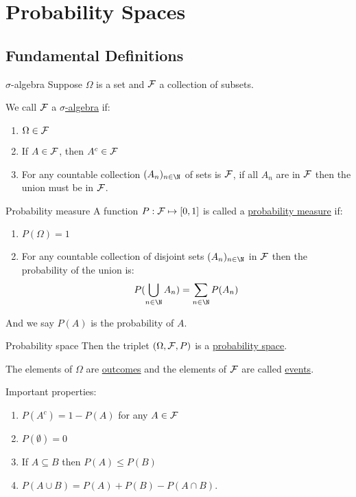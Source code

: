 \documentclass[../Main.tex]{subfiles}
\begin{document}
\section{Probability Spaces}
\subsection{Fundamental Definitions}
\begin{definition}{$\sigma$-algebra}
    Suppose $\Omega$ is a set and $\mathcal{F}$ a collection of subsets.\par
    We call $\mathcal{F}$ a \underline{$\sigma$-algebra} if:
    \begin{enumerate}
        \item $\Omega \in \mathcal{F}$
        \item If $A \in \mathcal{F}$, then $A^c \in \mathcal{F}$ %
        \item For any countable collection $(A_n)_{n \in \N}$ of sets is $\mathcal{F}$, if all $A_n$ are in $\mathcal{F}$ then the union must be in $\mathcal{F}$.
    \end{enumerate}
\end{definition}
\begin{definition}{Probability measure}
    A function $P : \mathcal{F} \mapsto [0, 1]$ is called a \underline{probability measure} if:
    \begin{enumerate}
        \item $P(\Omega) = 1$
        \item For any countable collection of disjoint sets $(A_n)_{n \in \N}$ in $\mathcal{F}$ then the probability of the union is:
            \begin{equation*}
                P(\bigcup_{n \in \N} A_n) = \sum_{n \in \N} P(A_n)
            \end{equation*}
    \end{enumerate}
    And we say $P(A)$ is the probability of $A$.
\end{definition}
\begin{definition}{Probability space}
    Then the triplet $(\Omega, \mathcal{F}, P)$ is a \underline{probability space}.\par
    The elements of $\Omega$ are \underline{outcomes} and the elements of $\mathcal{F}$ are called \underline{events}.
\end{definition}
Important properties:
\begin{enumerate}
    \item $P(A^c) = 1 -P(A)$ for any $A \in \mathcal{F}$
    \item $P(\emptyset) = 0$
    \item If $A \subseteq B$ then $P(A) \leq P(B)$
    \item $P(A \cup B) = P(A) + P(B) - P(A \cap B)$.
\end{enumerate}
\end{document}
